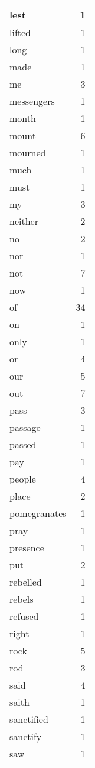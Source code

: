 \begin{center}
\begin{longtable}{l|r}
lest & 1 \\ \hline
lifted & 1 \\ \hline
long & 1 \\ \hline
made & 1 \\ \hline
me & 3 \\ \hline
messengers & 1 \\ \hline
month & 1 \\ \hline
mount & 6 \\ \hline
mourned & 1 \\ \hline
much & 1 \\ \hline
must & 1 \\ \hline
my & 3 \\ \hline
neither & 2 \\ \hline
no & 2 \\ \hline
nor & 1 \\ \hline
not & 7 \\ \hline
now & 1 \\ \hline
of & 34 \\ \hline
on & 1 \\ \hline
only & 1 \\ \hline
or & 4 \\ \hline
our & 5 \\ \hline
out & 7 \\ \hline
pass & 3 \\ \hline
passage & 1 \\ \hline
passed & 1 \\ \hline
pay & 1 \\ \hline
people & 4 \\ \hline
place & 2 \\ \hline
pomegranates & 1 \\ \hline
pray & 1 \\ \hline
presence & 1 \\ \hline
put & 2 \\ \hline
rebelled & 1 \\ \hline
rebels & 1 \\ \hline
refused & 1 \\ \hline
right & 1 \\ \hline
rock & 5 \\ \hline
rod & 3 \\ \hline
said & 4 \\ \hline
saith & 1 \\ \hline
sanctified & 1 \\ \hline
sanctify & 1 \\ \hline
saw & 1 \\ \hline

\end{longtable}
\end{center}

